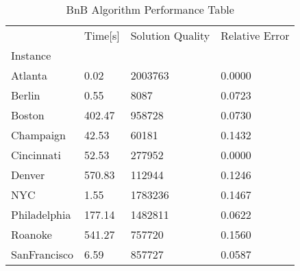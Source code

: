 \begin{table} [H]
\caption{ BnB Algorithm Performance Table }
\begin{tabular}{llll}
\toprule
{} & Time[s] & Solution Quality & Relative Error \\
Instance     &         &                  &                \\
\midrule
Atlanta      &    0.02 &          2003763 &         0.0000 \\
Berlin       &    0.55 &             8087 &         0.0723 \\
Boston       &  402.47 &           958728 &         0.0730 \\
Champaign    &   42.53 &            60181 &         0.1432 \\
Cincinnati   &   52.53 &           277952 &         0.0000 \\
Denver       &  570.83 &           112944 &         0.1246 \\
NYC          &    1.55 &          1783236 &         0.1467 \\
Philadelphia &  177.14 &          1482811 &         0.0622 \\
Roanoke      &  541.27 &           757720 &         0.1560 \\
SanFrancisco &    6.59 &           857727 &         0.0587 \\
\bottomrule
\end{tabular}
\end{table}
